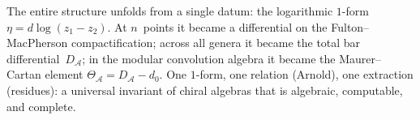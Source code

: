 \documentclass[11pt]{report}
\theoremstyle{definition}
\theoremstyle{remark}
\providecommand{\cA}{\mathcal{A}}
\numberwithin{equation}{section}
\begin{document}
\bigskip

\noindent
The entire structure unfolds from a single datum: the logarithmic
$1$-form $\eta = d\log(z_1 - z_2)$. At $n$~points it became a
differential on the Fulton--MacPherson compactification; across all
genera it became the total bar differential~$D_\cA$; in the modular
convolution algebra it became the Maurer--Cartan element
$\Theta_\cA = D_\cA - d_0$. One $1$-form, one relation (Arnold),
one extraction (residues): a universal invariant of chiral algebras
that is algebraic, computable, and complete.
\end{document}
